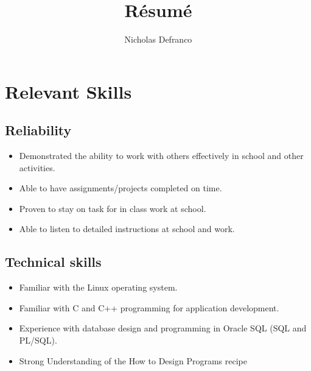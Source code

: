 \documentclass{article}
\begin{document}
\title{R\'esum\'e}
\author{Nicholas Defranco}

\maketitle

\pagenumbering{}

\section{Relevant Skills}

\subsection{Reliability}

\begin{itemize}

\item Demonstrated the ability to work with others effectively in school and
	other activities.

\item Able to have assignments/projects completed on time.

\item Proven to stay on task for in class work at school.

\item Able to listen to detailed instructions at school and work.

\end{itemize}

\subsection{Technical skills}

\begin{itemize}

\item Familiar with the Linux operating system.

\item Familiar with C and C++ programming for application development.

\item Experience with database design and programming in Oracle SQL (SQL and
	PL/SQL).

\item Strong Understanding of the How to Design Programs recipe

\end{itemize}
\end{document}
